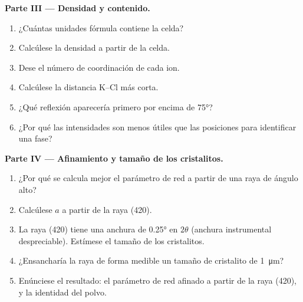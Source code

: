 \begin{problem}
\medskip\noindent\textbf{Parte III --- Densidad y contenido.}
\begin{enumerate}[resume]
  \item ¿Cuántas unidades fórmula contiene la celda?
  \item Calcúlese la densidad a partir de la celda.
  \item Dese el número de coordinación de cada ion.
  \item Calcúlese la distancia K--Cl más corta.
  \item ¿Qué reflexión aparecería primero por encima de \ang{75}?
  \item ¿Por qué las intensidades son menos útiles que las posiciones para identificar una fase?
\end{enumerate}

\medskip\noindent\textbf{Parte IV --- Afinamiento y tamaño de los cristalitos.}
\begin{enumerate}[resume]
  \item ¿Por qué se calcula mejor el parámetro de red a partir de una raya de ángulo alto?
  \item Calcúlese $a$ a partir de la raya (420).
  \item La raya (420) tiene una anchura de \ang{0.25} en $2\theta$ (anchura instrumental
        despreciable). Estímese el tamaño de los cristalitos.
  \item ¿Ensancharía la raya de forma medible un tamaño de cristalito de \qty{1}{\micro m}?
  \item Enúnciese el resultado: el parámetro de red afinado a partir de la raya (420), y
        la identidad del polvo.
\end{enumerate}
\end{problem}
